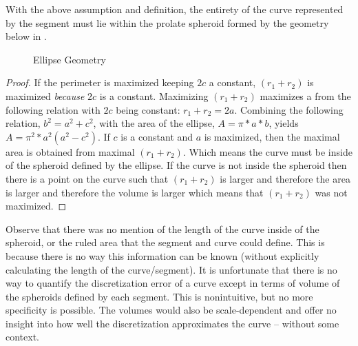 \begin{theorem}
With the above assumption and definition, the entirety of the curve represented by the segment must lie within the prolate spheroid  formed by the geometry below in .
\end{theorem}

\begin{figure}[h!]
  \caption{\label{fig:EllipseGeometry} Ellipse Geometry \cite{weissteineSagitta}}
\end{figure}

\begin{proof}
If the perimeter is maximized keeping $2c$ a constant, $(r_1 + r_2)$ is 
maximized \textit{because} $2c$ is a constant.  Maximizing $(r_1+r_2)$ 
maximizes a from the following relation with $2c$ being constant: $r_1 + 
r_2 = 2a$.  Combining the following relation, $b^2 = a^2 + c^2$, with the 
area of the ellipse, $A = \pi * a * b$, yields $A=\pi^{2}*a^{2}(a^{2} - 
c^2)$.  If $c$ is a constant and $a$ is maximized, then the maximal area 
is obtained from maximal $(r_1+r_2)$.  Which means the curve must be 
inside of the spheroid defined by the ellipse.  If the curve is not inside 
the spheroid then there is a point on the curve such that $(r_1+r_2)$ is 
larger and therefore the area is larger and therefore the volume is larger 
which means that $(r_1+r_2)$ was not maximized.
\end{proof}

Observe that there was no mention of the length of the curve inside of the 
spheroid, or the ruled area that the segment and curve could define.  
This is because there is no way this information can be known (without 
explicitly calculating the length of the curve/segment).  It is 
unfortunate that there is no way to quantify the discretization error of a 
curve except in terms of volume of the spheroids defined by each segment.  
This is nonintuitive, but no more specificity is possible.  The volumes 
would also be scale-dependent and offer no insight into how well the 
discretization approximates the curve -- without some context.
